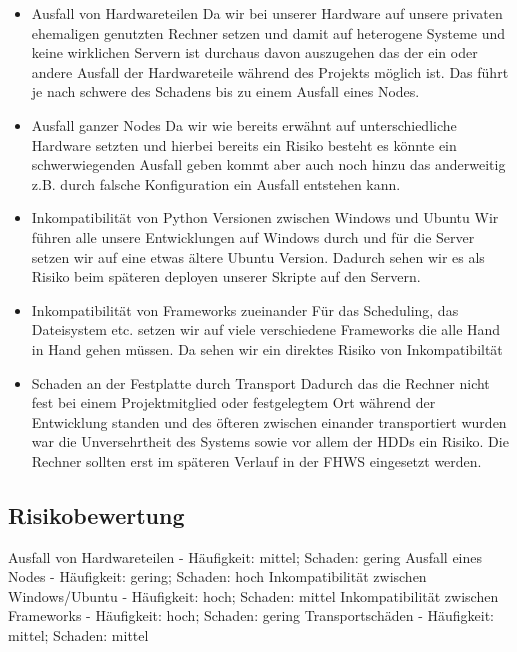 \documentclass[12pt,oneside,a4paper,parskip]{scrbook}
\begin{document}
\begin{itemize}
\item Ausfall von Hardwareteilen
Da wir bei unserer Hardware auf unsere privaten ehemaligen genutzten Rechner setzen und damit auf heterogene Systeme und keine wirklichen Servern ist durchaus davon auszugehen das der ein oder andere Ausfall der Hardwareteile während des Projekts möglich ist. Das führt je nach schwere des Schadens bis zu einem Ausfall eines Nodes.
\item Ausfall ganzer Nodes
Da wir wie bereits erwähnt auf unterschiedliche Hardware setzten und hierbei bereits ein Risiko besteht es könnte ein schwerwiegenden Ausfall geben kommt aber auch noch hinzu das anderweitig z.B. durch falsche Konfiguration ein Ausfall entstehen kann. 
\item Inkompatibilität von Python Versionen zwischen Windows und Ubuntu
Wir führen alle unsere Entwicklungen auf Windows durch und für die Server setzen wir auf eine etwas ältere Ubuntu Version. Dadurch sehen wir es als Risiko beim späteren deployen unserer Skripte auf den Servern.
\item Inkompatibilität von Frameworks zueinander
Für das Scheduling, das Dateisystem etc. setzen wir auf viele verschiedene Frameworks die alle Hand in Hand gehen müssen. Da sehen wir ein direktes Risiko von Inkompatibiltät
\item Schaden an der Festplatte durch Transport
Dadurch das die Rechner nicht fest bei einem Projektmitglied oder festgelegtem Ort während der Entwicklung standen und des öfteren zwischen einander 
transportiert wurden war die Unversehrtheit des Systems sowie vor allem der HDDs ein Risiko. Die Rechner sollten erst im späteren Verlauf in der FHWS eingesetzt werden.
\end{itemize}
\subsection{Risikobewertung}
Ausfall von Hardwareteilen - Häufigkeit: mittel; Schaden: gering
Ausfall eines Nodes - Häufigkeit: gering; Schaden: hoch
Inkompatibilität zwischen Windows/Ubuntu - Häufigkeit: hoch; Schaden: mittel
Inkompatibilität zwischen Frameworks - Häufigkeit: hoch; Schaden: gering
Transportschäden - Häufigkeit: mittel; Schaden: mittel
\end{document}
